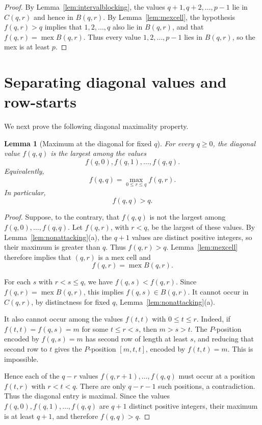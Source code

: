 \documentclass[11pt]{article}
\newtheorem{lemma}[theorem]{Lemma}
\newcommand{\Mex}{\operatorname{mex}}
\begin{document}
\begin{proof}
By Lemma~\ref{lem:intervalblocking}, the values $q+1,q+2,\ldots,p-1$ lie in
$C(q,r)$ and hence in $B(q,r)$. By Lemma~\ref{lem:mexcell}, the hypothesis
$f(q,r)>q$ implies that $1,2,\ldots,q$ also lie in $B(q,r)$, and that
$f(q,r)=\Mex B(q,r)$. Thus every value $1,2,\ldots,p-1$ lies in $B(q,r)$, so
the mex is at least $p$.
\end{proof}

\section{Separating diagonal values and row-starts}

We next prove the following diagonal maximality property.

\begin{lemma}[Maximum at the diagonal for fixed $q$]\label{lem:diagonalmax}
For every $q\ge 0$, the diagonal value $f(q,q)$ is the largest among the
values
\[
        f(q,0),f(q,1),\ldots,f(q,q).
\]
Equivalently,
\[
        f(q,q)=\max_{0\le r\le q} f(q,r).
\]
In particular,
\[
        f(q,q)>q.
\]
\end{lemma}

\begin{proof}
Suppose, to the contrary, that \(f(q,q)\) is not the largest among
\(f(q,0),\ldots,f(q,q)\). Let \(f(q,r)\), with \(r<q\), be the largest
of these values. By Lemma~\ref{lem:nonattacking}(a), the \(q+1\) values
are distinct positive integers, so their maximum is greater than \(q\).
Thus \(f(q,r)>q\). Lemma~\ref{lem:mexcell} therefore implies that
\((q,r)\) is a mex cell and
\[
        f(q,r)=\Mex B(q,r).
\]

For each \(s\) with \(r<s\le q\), we have \(f(q,s)<f(q,r)\). Since
\(f(q,r)=\Mex B(q,r)\), this implies \(f(q,s)\in B(q,r)\). It cannot occur in
\(C(q,r)\), by distinctness for fixed \(q\), Lemma~\ref{lem:nonattacking}(a).

It also cannot occur among the values $f(t,t)$ with $0\le t\le r$. Indeed, if
$f(t,t)=f(q,s)=m$ for some $t\le r<s$, then $m>s>t$. The $P$-position encoded
by $f(q,s)=m$ has second row of length at least $s$, and reducing that second
row to $t$ gives the $P$-position $[m,t,t]$, encoded by $f(t,t)=m$. This is
impossible.

Hence each of the $q-r$ values $f(q,r+1),\ldots,f(q,q)$ must occur at a
position $f(t,r)$ with $r<t<q$. There are only $q-r-1$ such positions, a
contradiction. Thus the diagonal entry is maximal. Since the values
$f(q,0),f(q,1),\ldots,f(q,q)$ are $q+1$ distinct positive integers, their
maximum is at least $q+1$, and therefore
$f(q,q)>q$.
\end{proof}
\end{document}
